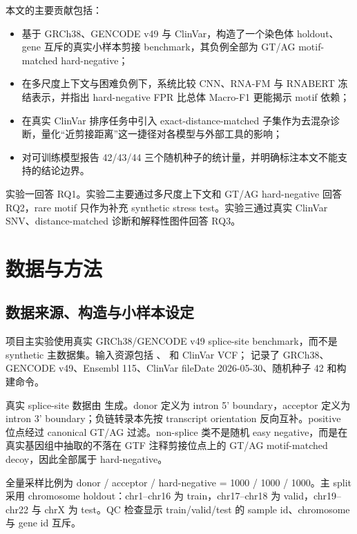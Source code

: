 \documentclass[
    oneside,
    fontset = win,
  ]{njuthesis}
\begin{document}
本文的主要贡献包括：

\begin{itemize}
  \item 基于 GRCh38、GENCODE v49 与 ClinVar，构造了一个染色体 holdout、gene 互斥的真实小样本剪接 benchmark，其负例全部为 GT/AG motif-matched hard-negative；
  \item 在多尺度上下文与困难负例下，系统比较 CNN、RNA-FM 与 RNABERT 冻结表示，并指出 hard-negative FPR 比总体 Macro-F1 更能揭示 motif 依赖；
  \item 在真实 ClinVar 排序任务中引入 exact-distance-matched 子集作为去混杂诊断，量化“近剪接距离”这一捷径对各模型与外部工具的影响；
  \item 对可训练模型报告 42/43/44 三个随机种子的统计量，并明确标注本文不能支持的结论边界。
\end{itemize}

实验一回答 RQ1。实验二主要通过多尺度上下文和 GT/AG hard-negative 回答 RQ2，rare motif 只作为补充 synthetic stress test。实验三通过真实 ClinVar SNV、distance-matched 诊断和解释性图件回答 RQ3。

\chapter{数据与方法}

\section{数据来源、构造与小样本设定}

项目主实验使用真实 GRCh38/GENCODE v49\cite{frankish2019} splice-site benchmark，而不是 synthetic 主数据集。输入资源包括 、 和 ClinVar VCF； 记录了 GRCh38、GENCODE v49、Ensembl 115、ClinVar fileDate 2026-05-30、随机种子 42 和构建命令。

真实 splice-site 数据由  生成。donor 定义为 intron 5' boundary，acceptor 定义为 intron 3' boundary；负链转录本先按 transcript orientation 反向互补。positive 位点经过 canonical GT/AG 过滤。non-splice 类不是随机 easy negative，而是在真实基因组中抽取的不落在 GTF 注释剪接位点上的 GT/AG motif-matched decoy，因此全部属于 hard-negative。

全量采样比例为 donor / acceptor / hard-negative = 1000 / 1000 / 1000。主 split 采用 chromosome holdout：chr1--chr16 为 train，chr17--chr18 为 valid，chr19--chr22 与 chrX 为 test。QC 检查显示 train/valid/test 的 sample id、chromosome 与 gene id 互斥。
\end{document}
